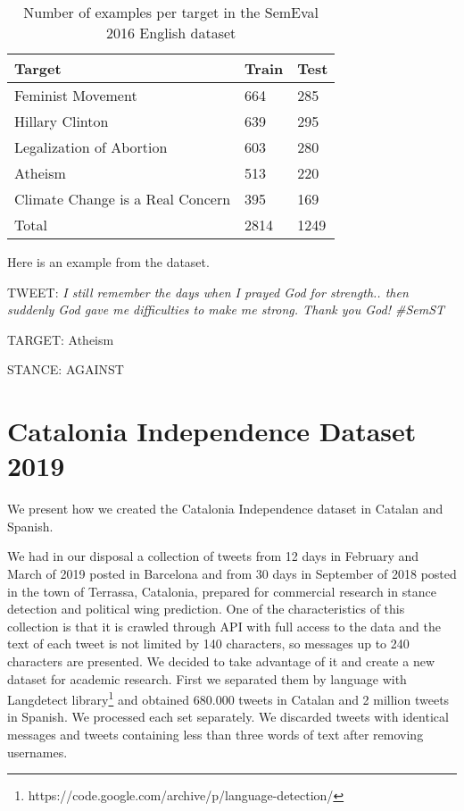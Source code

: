 \documentclass[10pt, a4paper]{article}
\begin{document}
\begin{table}[h]
\centering
\begin{tabularx}{\columnwidth}{|l|l|X|}
\hline 
Target              & Train & Test \\ \hline 
Feminist Movement   & 664   & 285     \\ \hline
Hillary Clinton     & 639   & 295   \\ \hline
Legalization of Abortion    & 603   & 280   \\\hline
Atheism             & 513   & 220   \\ \hline
Climate Change is a Real Concern & 395  & 169   \\ \hline
Total               & 2814  & 1249 \\ \hline

\end{tabularx}
\caption{Number of examples per target in the SemEval 2016 English dataset}
\label{tab:eng_dataset}
\end{table}


Here is an example from the dataset. 


TWEET: \textit{I still remember the days when I prayed God for strength.. then suddenly God gave me difficulties to make me strong. Thank you God! \#SemST}

TARGET: Atheism

STANCE: AGAINST



\section{Catalonia Independence Dataset 2019}

We present how we created the Catalonia Independence dataset in Catalan and Spanish. 

We had in our disposal a collection of tweets from 12 days in February and March of 2019 posted in Barcelona and from 30 days in September of 2018 posted in the town of Terrassa, Catalonia, prepared for commercial research in stance detection and political wing prediction. One of the characteristics of this collection is that it is crawled through API with full access to the data and the text of each tweet is not limited by 140 characters, so messages up to 240 characters are presented. We decided to take advantage of it and create a new dataset for academic research. First we separated them by language with Langdetect library\footnote{https://code.google.com/archive/p/language-detection/} and obtained 680.000 tweets in Catalan and 2 million tweets in Spanish. We processed each set separately. We discarded tweets with identical messages and tweets containing less than three words of text after removing usernames.   
\end{document}
